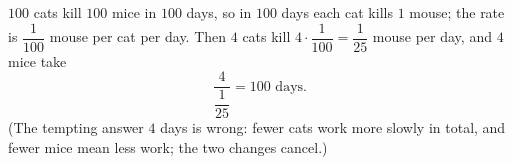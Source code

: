 $100$ cats kill $100$ mice in $100$ days, so in $100$ days each cat kills $1$ mouse; the rate is $\dfrac1{100}$ mouse per cat per day. Then $4$ cats kill $4\cdot\dfrac1{100}=\dfrac{1}{25}$ mouse per day, and $4$ mice take
\[\dfrac{4}{\dfrac1{25}}=\boxed{100}\text{ days}.\]
(The tempting answer $4$ days is wrong: fewer cats work more slowly in total, and fewer mice mean less work; the two changes cancel.)
